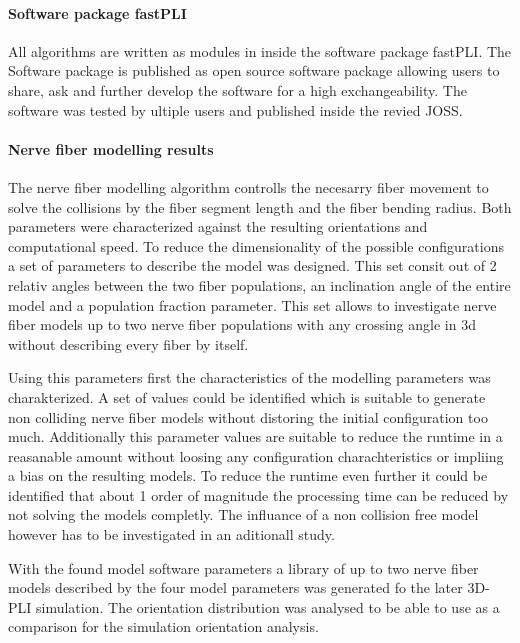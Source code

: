 \paragraph{Software package \acs{fastPLI}}
% 
All algorithms are written as modules in \python{} inside the software package \ac{fastPLI}.
The Software package is published as open source software package allowing users to share, ask and further develop the software for a high exchangeability. 
The software was tested by ultiple users and published inside the revied \ac{JOSS}.
% 
% 
% 
\paragraph{Nerve fiber modelling results}
% 
The nerve fiber modelling algorithm controlls the necesarry fiber movement to solve the collisions by the fiber segment length and the fiber bending radius.
Both parameters were characterized against the resulting orientations and computational speed.
To reduce the dimensionality of the possible configurations a set of parameters to describe the model was designed.
This set consit out of 2 relativ angles between the two fiber populations, an inclination angle of the entire model and a population fraction parameter.
This set allows to investigate nerve fiber models up to two nerve fiber populations with any crossing angle in 3d without describing every fiber by itself.
\par
% 
Using this parameters first the characteristics of the modelling parameters was charakterized.
A set of values could be identified which is suitable to generate non colliding nerve fiber models without distoring the initial configuration too much.
Additionally this parameter values are suitable to reduce the runtime in a reasanable amount without loosing any configuration charachteristics or impliing a bias on the resulting models.
To reduce the runtime even further it could be identified that about 1 order of magnitude the processing time can be reduced by not solving the models completly.
The influance of a non collision free model however has to be investigated in an aditionall study.
\par
% 
With the found model software parameters a library of up to two nerve fiber models described by the four model parameters was generated fo the later \ac{3D-PLI} simulation.
The orientation distribution was analysed to be able to use as a comparison for the simulation orientation analysis.
% 
% 
% 
